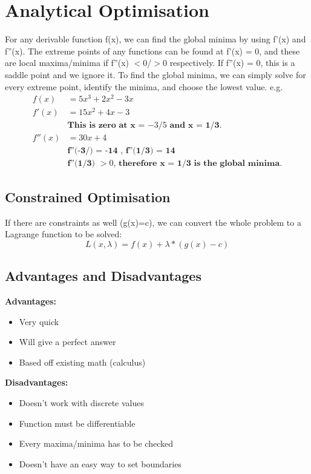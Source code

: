\section{Analytical Optimisation}
For any derivable function f(x), we can find the global minima by using f'(x) and f''(x). The extreme points of any functions can be found at f'(x) = 0, and these are local maxima/minima if f''(x) $<0$/$>0$ respectively. If f''(x) = 0, this is a saddle point and we ignore it. To find the global minima, we can simply solve for every extreme point, identify the minima, and choose the lowest value. e.g.
\begin{align}
    f(x) &= 5x^3 + 2x^2 - 3x \nonumber \\
    f'(x) &= 15x^2 + 4x - 3 \nonumber \\
    & \textbf{This is zero at x = $-3/5$ and x = 1/3.} \nonumber \\
    f''(x) &= 30x + 4 \nonumber\\
    & \textbf{f''(-3/) = -14 , f''(1/3) = 14} \nonumber\\
    & \textbf{f''(1/3) $> 0$, therefore x = 1/3 is the global minima.} \nonumber 
\end{align}

\subsection{Constrained Optimisation}
If there are constraints as well (g(x)=c), we can convert the whole problem to a Lagrange function to be solved:
\begin{equation}
    L(x, \lambda) = f(x) + \lambda * (g(x) -c)
\end{equation} 

\subsection{Advantages and Disadvantages}
\textbf{Advantages:}
\begin{itemize}
    \item Very quick
    \item Will give a perfect answer
    \item Based off existing math (calculus)
\end{itemize}
\textbf{Disadvantages:}
\begin{itemize}
    \item Doesn't work with discrete values
    \item Function must be differentiable
    \item Every maxima/minima has to be checked
    \item Doesn't have an easy way to set boundaries
\end{itemize}
\newpage
